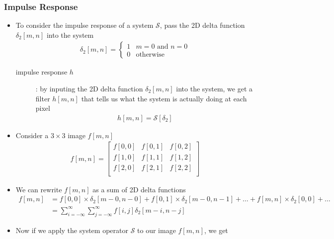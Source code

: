 \documentclass[letterpaper,12pt]{article}
\begin{document}
\subsubsection{Impulse Response}
\begin{itemize}
 \item To consider the impulse response of a system $\mathcal{S}$, pass the 2D delta function $\delta_2 [m,n]$ into the system
       \begin{align}
        \delta_2[m, n] = \begin{cases} 1 & m = 0 \text{ and } n = 0 \\
         0 & \text{otherwise}
        \end{cases}
       \end{align}
       \begin{description}
        \item[impulse response $h$]: by inputing the 2D delta function $\delta_2 [m,n]$ into the system, we get a filter $h[m,n]$ that tells us what the system is actually doing at each pixel
              \begin{align}
               h[m,n] = \mathcal{S}[\delta_2]
              \end{align}
       \end{description}
 \item Consider a $3 \times 3$ image $f[m,n]$
       \begin{align}
        f[m,n] =
        \begin{bmatrix}
         f[0,0] & f[0,1] & f[0,2] \\
         f[1,0] & f[1,1] & f[1,2] \\
         f[2,0] & f[2,1] & f[2,2] \\
        \end{bmatrix}
       \end{align}
 \item We can rewrite $f[m,n]$ as a sum of 2D delta functions
       \begin{align}
        f[m,n] & = f[0,0] \times \delta_2[m-0,n-0] + f[0,1] \times \delta_2[m-0,n-1] + \dots + f[m,n] \times \delta_2[0,0] + \dots \\
               & = \sum\limits_{i = -\infty}^{\infty}\sum\limits_{j = -\infty}^{\infty} f[i, j] \delta_2[m - i, n - j]
       \end{align}
 \item Now if we apply the system operator $\mathcal{S}$ to our image $f[m,n]$, we get
       \begin{align}

\end{align}
\end{itemize}
\end{document}
